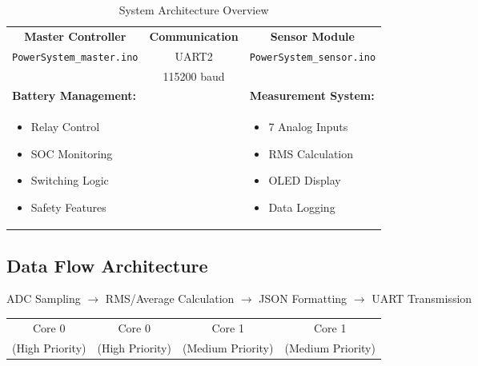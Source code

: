\documentclass[11pt,a4paper]{article}
\begin{document}
\begin{table}[H]
\centering
\begin{tabular}{|p{6cm}|p{2cm}|p{6cm}|}
\hline
\multicolumn{1}{|c|}{\textbf{Master Controller}} & \multicolumn{1}{c|}{\textbf{Communication}} & \multicolumn{1}{c|}{\textbf{Sensor Module}} \\
\multicolumn{1}{|c|}{\texttt{PowerSystem\_master.ino}} & \multicolumn{1}{c|}{UART2} & \multicolumn{1}{c|}{\texttt{PowerSystem\_sensor.ino}} \\
\multicolumn{1}{|c|}{} & \multicolumn{1}{c|}{115200 baud} & \multicolumn{1}{c|}{} \\
\hline
\textbf{Battery Management:} & & \textbf{Measurement System:} \\
\begin{itemize}[leftmargin=*,noitemsep,topsep=0pt]
\item Relay Control
\item SOC Monitoring
\item Switching Logic
\item Safety Features
\end{itemize} & & \begin{itemize}[leftmargin=*,noitemsep,topsep=0pt]
\item 7 Analog Inputs
\item RMS Calculation
\item OLED Display
\item Data Logging
\end{itemize} \\
\hline
\end{tabular}
\caption{System Architecture Overview}
\end{table}

\subsection{Data Flow Architecture}

\begin{tcolorbox}[colback=blue!5!white,colframe=blue!75!black,title=Sensor Module Flow]
ADC Sampling $\rightarrow$ RMS/Average Calculation $\rightarrow$ JSON Formatting $\rightarrow$ UART Transmission

\begin{tabular}{cccc}
Core 0 & Core 0 & Core 1 & Core 1 \\
(High Priority) & (High Priority) & (Medium Priority) & (Medium Priority)
\end{tabular}
\end{tcolorbox}
\end{document}
